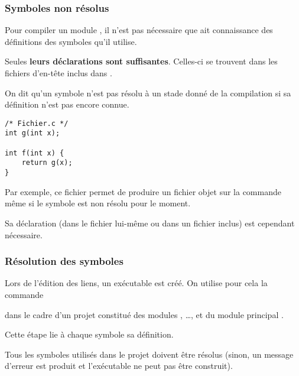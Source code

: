 \begin{frame}[fragile]
\frametitle{Symboles non résolus}
Pour compiler un module , il n'est pas nécessaire que 
ait connaissance des définitions des symboles qu'il utilise.
\medskip

Seules {\bf leurs déclarations sont suffisantes}. Celles-ci se trouvent
dans les fichiers d'en-tête inclus dans .
\bigskip

On dit qu'un \alert{symbole n'est pas résolu} à un stade donné de la
compilation si sa définition n'est pas encore connue.
\bigskip

\begin{minipage}[c]{.3\textwidth}
\begin{lstlisting}[frame=single,numbers=none]
/* Fichier.c */
int g(int x);

int f(int x) {
    return g(x);
}
\end{lstlisting}
\end{minipage}\qquad
\begin{minipage}[c]{.6\textwidth}
Par exemple, ce fichier permet de produire un fichier objet sur la commande
 même si le symbole  est non résolu pour
le moment.
\smallskip

Sa déclaration (dans le fichier lui-même ou dans un fichier inclus) est
cependant nécessaire.
\end{minipage}
\end{frame}

\begin{frame}[fragile]
\frametitle{Résolution des symboles}
Lors de l'édition des liens, un exécutable est créé. On utilise pour
cela la commande
\begin{center}  \end{center}
dans le cadre d'un projet constitué des modules , \dots, 
et du module principal .
\bigskip

Cette étape \alert{lie à chaque symbole sa définition}.
\bigskip
\bigskip

Tous les symboles utilisés dans le projet doivent être résolus (sinon,
un message d'erreur est produit et l'exécutable ne peut pas être
construit).
\end{frame}


